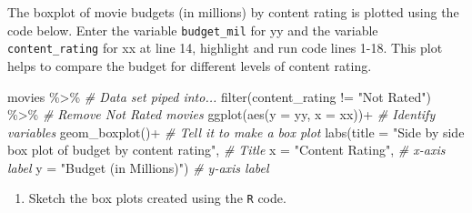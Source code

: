 \documentclass[
]{report}
\newenvironment{Shaded}{\begin{snugshade}}{\end{snugshade}}
\newcommand{\AttributeTok}[1]{\textcolor[rgb]{0.77,0.63,0.00}{#1}}
\newcommand{\CommentTok}[1]{\textcolor[rgb]{0.56,0.35,0.01}{\textit{#1}}}
\newcommand{\FunctionTok}[1]{\textcolor[rgb]{0.00,0.00,0.00}{#1}}
\newcommand{\NormalTok}[1]{#1}
\newcommand{\SpecialCharTok}[1]{\textcolor[rgb]{0.00,0.00,0.00}{#1}}
\newcommand{\StringTok}[1]{\textcolor[rgb]{0.31,0.60,0.02}{#1}}
\providecommand{\tightlist}{%
  \setlength{\itemsep}{0pt}\setlength{\parskip}{0pt}}
\begin{document}
The boxplot of movie budgets (in millions) by content rating is plotted using the code below. Enter the variable \texttt{budget\_mil} for yy and the variable \texttt{content\_rating} for xx at line 14, highlight and run code lines 1-18. This plot helps to compare the budget for different levels of content rating.

\begin{Shaded}
\begin{Highlighting}[]
\NormalTok{movies }\SpecialCharTok{\%\textgreater{}\%}  \CommentTok{\# Data set piped into...}
  \FunctionTok{filter}\NormalTok{(content\_rating }\SpecialCharTok{!=} \StringTok{"Not Rated"}\NormalTok{) }\SpecialCharTok{\%\textgreater{}\%} \CommentTok{\# Remove Not Rated movies}
  \FunctionTok{ggplot}\NormalTok{(}\FunctionTok{aes}\NormalTok{(}\AttributeTok{y =}\NormalTok{ yy, }\AttributeTok{x =}\NormalTok{ xx))}\SpecialCharTok{+}  \CommentTok{\# Identify variables}
  \FunctionTok{geom\_boxplot}\NormalTok{()}\SpecialCharTok{+}  \CommentTok{\# Tell it to make a box plot}
  \FunctionTok{labs}\NormalTok{(}\AttributeTok{title =} \StringTok{"Side by side box plot of budget by content rating"}\NormalTok{,  }\CommentTok{\# Title}
       \AttributeTok{x =} \StringTok{"Content Rating"}\NormalTok{,    }\CommentTok{\# x{-}axis label}
       \AttributeTok{y =} \StringTok{"Budget (in Millions)"}\NormalTok{)  }\CommentTok{\# y{-}axis label}
\end{Highlighting}
\end{Shaded}

\begin{enumerate}
\def\labelenumi{\arabic{enumi}.}
\setcounter{enumi}{4}
\tightlist
\item
  Sketch the box plots created using the \texttt{R} code.
\end{enumerate}

\vspace{1.5in}
\end{document}
